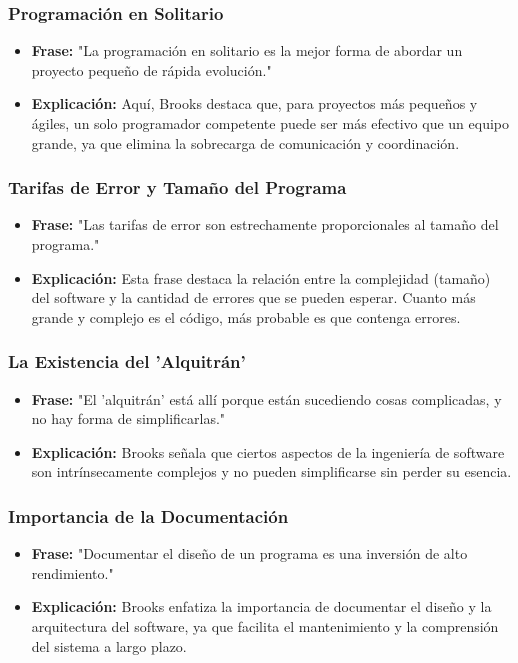\documentclass{beamer}
\begin{document}
\begin{frame}
	\frametitle{Programación en Solitario}
	\begin{itemize}
		\item \textbf{Frase:} "La programación en solitario es la mejor forma de abordar un proyecto pequeño de rápida evolución."
		\item \textbf{Explicación:} Aquí, Brooks destaca que, para proyectos más pequeños y ágiles, un solo programador competente puede ser más efectivo que un equipo grande, ya que elimina la sobrecarga de comunicación y coordinación.
	\end{itemize}
\end{frame}

\begin{frame}
	\frametitle{Tarifas de Error y Tamaño del Programa}
	\begin{itemize}
		\item \textbf{Frase:} "Las tarifas de error son estrechamente proporcionales al tamaño del programa."
		\item \textbf{Explicación:} Esta frase destaca la relación entre la complejidad (tamaño) del software y la cantidad de errores que se pueden esperar. Cuanto más grande y complejo es el código, más probable es que contenga errores.
	\end{itemize}
\end{frame}

\begin{frame}
	\frametitle{La Existencia del 'Alquitrán'}
	\begin{itemize}
		\item \textbf{Frase:} "El 'alquitrán' está allí porque están sucediendo cosas complicadas, y no hay forma de simplificarlas."
		\item \textbf{Explicación:} Brooks señala que ciertos aspectos de la ingeniería de software son intrínsecamente complejos y no pueden simplificarse sin perder su esencia.
	\end{itemize}
\end{frame}

\begin{frame}
	\frametitle{Importancia de la Documentación}
	\begin{itemize}
		\item \textbf{Frase:} "Documentar el diseño de un programa es una inversión de alto rendimiento."
		\item \textbf{Explicación:} Brooks enfatiza la importancia de documentar el diseño y la arquitectura del software, ya que facilita el mantenimiento y la comprensión del sistema a largo plazo.
	\end{itemize}
\end{frame}
\end{document}

